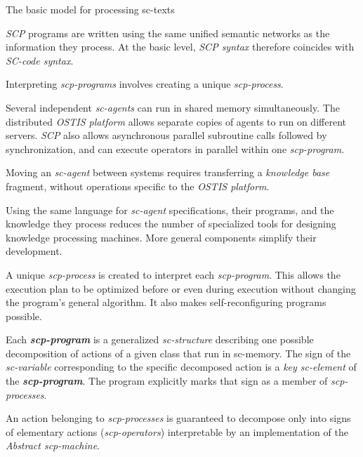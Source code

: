 \begin{frame}{The basic model for processing sc-texts}
\topline
\justifying
\vspace{10mm}

\begin{textitemize}
    \item \textit{SCP} programs are written using the same unified semantic networks as the information they process. At the basic level, \textit{SCP syntax} therefore coincides with \textit{SC-code syntax}.
    \item Interpreting \textit{scp-programs} involves creating a unique \textit{scp-process}.
    \item Several independent \textit{sc-agents} can run in shared memory simultaneously. The distributed \textit{OSTIS platform} allows separate copies of agents to run on different servers. \textit{SCP} also allows asynchronous parallel subroutine calls followed by synchronization, and can execute operators in parallel within one \textit{scp-program}.
    \end{textitemize}
\end{frame}

\begin{frame}{}
\topline
\justifying
\vspace{10mm}
\small

\begin{textitemize}
    \item Moving an \textit{sc-agent} between systems requires transferring a \textit{knowledge base} fragment, without operations specific to the \textit{OSTIS platform}.
	\item Using the same language for \textit{sc-agent} specifications, their programs, and the knowledge they process reduces the number of specialized tools for designing knowledge processing machines. More general components simplify their development.
	\item A unique \textit{\mbox{scp-process}} is created to interpret each \textit{scp-program}. This allows the execution plan to be optimized before or even during execution without changing the program's general algorithm. It also makes self-reconfiguring programs possible.
\end{textitemize}
\end{frame}

\begin{frame}{}
\topline
\justifying
\vspace{10mm}

Each \textbf{\textit{scp-program}} is a generalized \textit{sc-structure} describing one possible decomposition of actions of a given class that run in sc-memory. The sign of the \textit{sc-variable} corresponding to the specific decomposed action is a \textit{key sc-element\scnrolesign} of the \textbf{\textit{scp-program}}. The program explicitly marks that sign as a member of \textit{scp-processes}.

An action belonging to \textit{scp-processes} is guaranteed to decompose only into signs of elementary actions (\textit{scp-operators}) interpretable by an implementation of the \textit{Abstract scp-machine}.
\end{frame}


